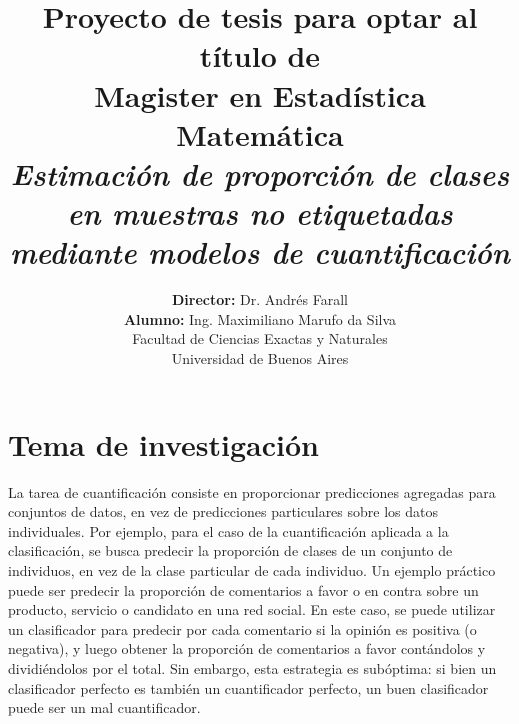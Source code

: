 \documentclass[a4paper, twoside, 11pt, spanish]{article}
\begin{document}
\begin{titlepage}

\title{ \textbf{Proyecto de tesis para optar al título de \\ Magister en
    Estadística Matemática}\\[2.5ex]
    \textit{Estimación de proporción de clases en muestras no etiquetadas \\ 
    mediante modelos de cuantificación} }

\author{ \textbf{Director:} Dr. Andrés Farall \\[2.5ex]
    \textbf{Alumno:} Ing. Maximiliano Marufo da Silva \\[2.5ex]
    \normalsize{Facultad de Ciencias Exactas y Naturales} \\
    \normalsize{Universidad de Buenos Aires} \\
}
\date{}

\end{titlepage}

\maketitle

\section*{Tema de investigación}

La tarea de cuantificación consiste en proporcionar predicciones agregadas para
conjuntos de datos, en vez de predicciones particulares sobre los datos
individuales. Por ejemplo, para el caso de la cuantificación aplicada a la
clasificación, se busca predecir la proporción de clases de un conjunto de
individuos, en vez de la clase particular de cada individuo. Un ejemplo práctico
puede ser predecir la proporción de comentarios a favor o en contra sobre un
producto, servicio o candidato en una red social. En este caso, se puede
utilizar un clasificador para predecir por cada comentario si la opinión es
positiva (o negativa), y luego obtener la proporción de comentarios a favor
contándolos y dividiéndolos por el total. Sin embargo, esta estrategia es
subóptima: si bien un clasificador perfecto es también un cuantificador
perfecto, un buen clasificador puede ser un mal cuantificador.
\end{document}
